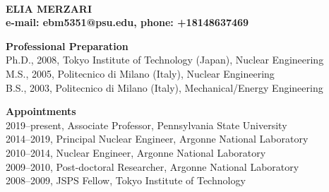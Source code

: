 \documentclass[11pt,letterpaper,english]{article}
\begin{document}
\setlength{\parindent}{0in} %

\pagestyle{fancy}   \renewcommand{%
\headrulewidth}{0.0pt}

\\
{\bf ELIA MERZARI}\\
{\bf e-mail: ebm5351@psu.edu, phone: +18148637469} \smallskip

\begin{flushleft} {\bf Professional Preparation}
{\parindent 16pt
   ~\\
   Ph.D., 2008, Tokyo Institute of Technology (Japan), Nuclear Engineering \\
   M.S.,  2005, Politecnico di Milano (Italy), Nuclear Engineering \\
   B.S.,  2003, Politecnico di Milano (Italy), Mechanical/Energy Engineering \\
}

\vspace{.04in}
{\bf Appointments}
{\parindent 16pt
  ~\\
  2019--present, Associate Professor, Pennsylvania State University\\
  2014--2019, Principal Nuclear Engineer, Argonne National Laboratory \\
  2010--2014, Nuclear Engineer, Argonne National Laboratory \\
  2009--2010, Post-doctoral Researcher, Argonne National Laboratory\\
  2008--2009, JSPS Fellow,  Tokyo Institute of Technology\\
}


\end{flushleft}
\end{document}
